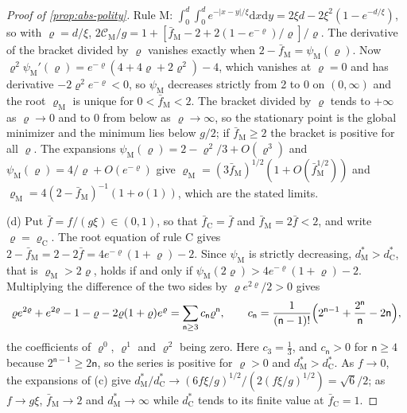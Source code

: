 \begin{proof}[Proof of \cref{prop:abs-polity}]
Rule M: $\int_0^d\int_0^de^{-\lvert x-y\rvert/\xi}\mathrm dx\mathrm dy=2\xi d-2\xi^2(1-e^{-d/\xi})$, so with $\varrho=d/\xi$, $2\mathcal C_{\mathrm M}/g=1+[\bar f_{\mathrm M}-2+2(1-e^{-\varrho})/\varrho]/\varrho$. The derivative of the bracket divided by $\varrho$ vanishes exactly when $2-\bar f_{\mathrm M}=\psi_{\mathrm M}(\varrho)$. Now $\varrho^2\psi_{\mathrm M}'(\varrho)=e^{-\varrho}(4+4\varrho+2\varrho^2)-4$, which vanishes at $\varrho=0$ and has derivative $-2\varrho^2e^{-\varrho}<0$, so $\psi_{\mathrm M}$ decreases strictly from 2 to 0 on $(0,\infty)$ and the root $\varrho_{\mathrm M}$ is unique for $0<\bar f_{\mathrm M}<2$. The bracket divided by $\varrho$ tends to $+\infty$ as $\varrho\to0$ and to $0$ from below as $\varrho\to\infty$, so the stationary point is the global minimizer and the minimum lies below $g/2$; if $\bar f_{\mathrm M}\ge2$ the bracket is positive for all $\varrho$. The expansions $\psi_{\mathrm M}(\varrho)=2-\varrho^2/3+O(\varrho^3)$ and $\psi_{\mathrm M}(\varrho)=4/\varrho+O(e^{-\varrho})$ give $\varrho_{\mathrm M}=(3\bar f_{\mathrm M})^{1/2}(1+O(\bar f_{\mathrm M}^{1/2}))$ and $\varrho_{\mathrm M}=4(2-\bar f_{\mathrm M})^{-1}(1+o(1))$, which are the stated limits.

(d) Put $\bar f=f/(g\xi)\in(0,1)$, so that $\bar f_{\mathrm C}=\bar f$ and $\bar f_{\mathrm M}=2\bar f<2$, and write $\varrho=\varrho_{\mathrm C}$. The root equation of rule C gives $2-\bar f_{\mathrm M}=2-2\bar f=4e^{-\varrho}(1+\varrho)-2$. Since $\psi_{\mathrm M}$ is strictly decreasing, $d^\ast_{\mathrm M}>d^\ast_{\mathrm C}$, that is $\varrho_{\mathrm M}>2\varrho$, holds if and only if $\psi_{\mathrm M}(2\varrho)>4e^{-\varrho}(1+\varrho)-2$. Multiplying the difference of the two sides by $\varrho e^{2\varrho}/2>0$ gives
\[
\varrho e^{2\varrho}+e^{2\varrho}-1-\varrho-2\varrho(1+\varrho)e^\varrho=\sum_{\mathsf n\ge3}c_{\mathsf n}\varrho^{\mathsf n},\qquad c_{\mathsf n}=\frac{1}{(\mathsf n-1)!}\Bigl(2^{\mathsf n-1}+\frac{2^{\mathsf n}}{\mathsf n}-2\mathsf n\Bigr),
\]
the coefficients of $\varrho^0$, $\varrho^1$ and $\varrho^2$ being zero. Here $c_3=\frac13$, and $c_{\mathsf n}>0$ for $\mathsf n\ge4$ because $2^{\mathsf n-1}\ge2\mathsf n$, so the series is positive for $\varrho>0$ and $d^\ast_{\mathrm M}>d^\ast_{\mathrm C}$. As $f\to0$, the expansions of (c) give $d^\ast_{\mathrm M}/d^\ast_{\mathrm C}\to(6f\xi/g)^{1/2}/(2(f\xi/g)^{1/2})=\sqrt6/2$; as $f\to g\xi$, $\bar f_{\mathrm M}\to2$ and $d^\ast_{\mathrm M}\to\infty$ while $d^\ast_{\mathrm C}$ tends to its finite value at $\bar f_{\mathrm C}=1$.
\end{proof}

